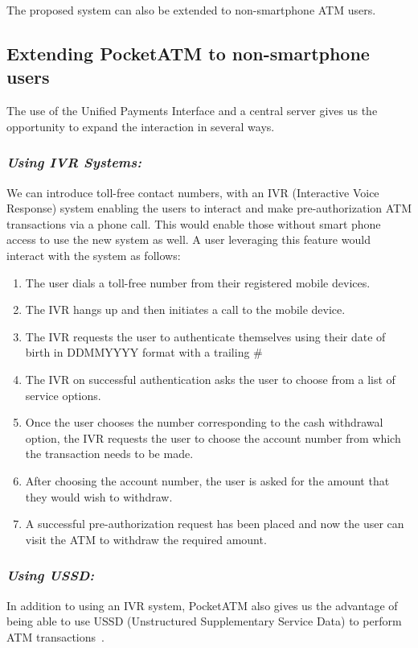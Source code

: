 The proposed system can also be extended to non-smartphone ATM users.

\subsection*{Extending PocketATM to non-smartphone users}
\label{ssec:extendingpocketatm}

The use of the Unified Payments Interface and a central server gives us the opportunity to expand the interaction in several ways.

\subsubsection*{\textbf{\textit{Using IVR Systems: }}}
\label{sssec:IVR}

We can introduce toll-free contact numbers, with an IVR (Interactive Voice Response) system enabling the users to interact and make pre-authorization ATM transactions via a phone call. This would enable those without smart phone access to use the new system as well. A user leveraging this feature would interact with the system as follows: 

\begin{enumerate}
    \item The user dials a toll-free number from their registered mobile devices.
    \item The IVR hangs up and then initiates a call to the mobile device.
    \item The IVR requests the user to authenticate themselves using their date of birth in DDMMYYYY format with a trailing \#
    \item The IVR on successful authentication asks the user to choose from a list of service options.
    \item Once the user chooses the number corresponding to the cash withdrawal option, the IVR requests the user to choose the account number from which the transaction needs to be made.
    \item After choosing the account number, the user is asked for the amount that they would wish to withdraw.
    \item A successful pre-authorization request has been placed and now the user can visit the ATM to withdraw the required amount.
\end{enumerate}

\subsubsection*{\textbf{\textit{Using USSD:}}}
\label{sssec:USSD}
In addition to using an IVR system, PocketATM also gives us the advantage of being able to use USSD (Unstructured Supplementary Service Data) to perform ATM transactions~\cite{perrier2015ussd}. 

